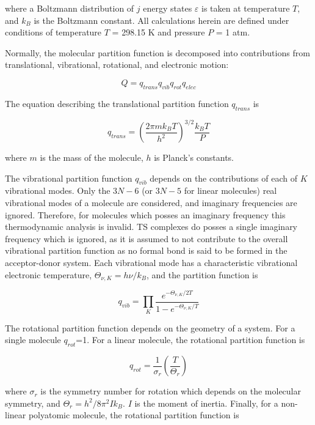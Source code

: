 \noindent where a Boltzmann distribution of $j$ energy states $\varepsilon$ is taken at temperature $T$, and $k_B$ is the Boltzmann constant. All calculations herein are defined under conditions of temperature $T$ = 298.15 K and pressure $P$ = 1 atm.

Normally, the molecular partition function is decomposed into contributions from translational, vibrational, rotational, and electronic motion:

\begin{equation}
  Q = q_{trans}q_{vib}q_{rot}q_{elec}
\end{equation}

\noindent The equation describing the translational partition function
$q_{trans}$ is

\begin{equation}
  q_{trans} = \left( \frac{2\pi m k_B T}{h^2} \right)^{3/2} \frac{k_B T}{P}
\end{equation}

\noindent where $m$ is the mass of the molecule, $h$ is Planck's constants.

The vibrational partition function $q_{vib}$ depends on the contributions of each of $K$ vibrational modes. Only the $3N-6$ (or $3N-5$ for linear molecules) real vibrational modes of a molecule are considered, and imaginary frequencies are ignored. Therefore, for molecules which posses an imaginary frequency this thermodynamic analysis is invalid. TS complexes do posses a single imaginary frequency which is ignored, as it is assumed to not contribute to the overall vibrational partition function as no formal bond is said to be formed in the acceptor-donor system. Each vibrational mode has a characteristic vibrational electronic temperature, $\Theta_{\nu,K} = h\nu/k_B$, and the partition function is

\begin{equation}
  q_{vib} = \prod_K \frac{e^{-\Theta_{\nu,K}/2T}}{1 - e^{-\Theta_{\nu,K}/T}}
\end{equation}

The rotational partition function depends on the geometry of a system. For a single molecule $q_{rot}$=1. For a linear molecule, the rotational partition function is

\begin{equation}
  q_{rot} = \frac{1}{\sigma_r} \left(\frac{T}{\Theta_r}\right)
\end{equation}

\noindent where $\sigma_r$ is the symmetry number for rotation which depends on the molecular symmetry, and $\Theta_r = h^2/8\pi^2Ik_B$. $I$ is the moment of inertia. Finally, for a non-linear polyatomic molecule, the rotational partition function is

